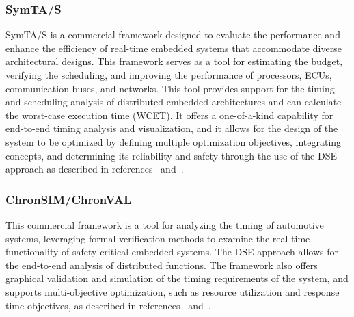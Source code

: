 \subsubsection{SymTA/S}  %
SymTA/S is a commercial framework designed to evaluate the performance and enhance the efficiency of real-time embedded systems that accommodate diverse architectural designs. This framework serves as a tool for estimating the budget, verifying the scheduling, and improving the performance of processors, ECUs, communication buses, and networks.
This tool provides support for the timing and scheduling analysis of distributed embedded architectures and can calculate the worst-case execution time (WCET). It offers a one-of-a-kind capability for end-to-end timing analysis and visualization, and it allows for the design of the system to be optimized by defining multiple optimization objectives, integrating concepts, and determining its reliability and safety through the use of the DSE approach as described in references~\cite{henia2005system} and~\cite{hamann2004symta}.







\subsubsection{ChronSIM/ChronVAL} %
This commercial framework is a tool for analyzing the timing of automotive systems, leveraging formal verification methods to examine the real-time functionality of safety-critical embedded systems. The DSE approach allows for the end-to-end analysis of distributed functions. The framework also offers graphical validation and simulation of the timing requirements of the system, and supports multi-objective optimization, such as resource utilization and response time objectives, as described in references~\cite{anssi2012chronval} and~\cite{inchron}.




